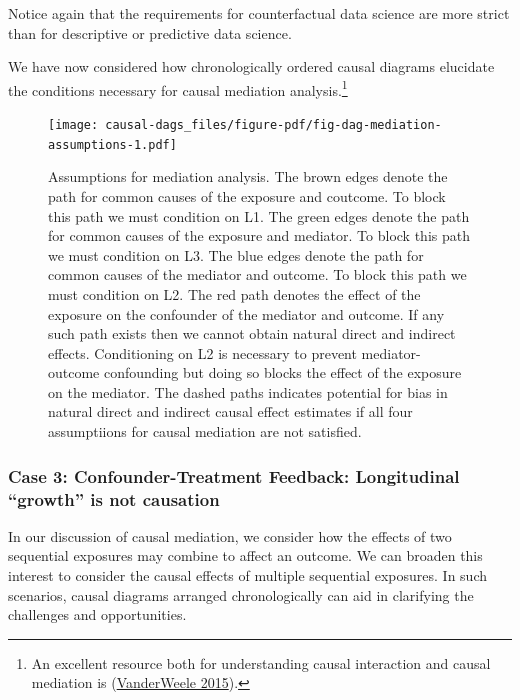 \documentclass[
  singlecolumn]{article}
\begin{document}
Notice again that the requirements for counterfactual data science are
more strict than for descriptive or predictive data science.

We have now considered how chronologically ordered causal diagrams
elucidate the conditions necessary for causal mediation
analysis.\footnote{An excellent resource both for understanding causal
  interaction and causal mediation is
  (\protect\hyperlink{ref-vanderweele2015}{VanderWeele 2015}).}

\begin{figure}

{\centering \texttt{[image: causal-dags\_files/figure-pdf/fig-dag-mediation-assumptions-1.pdf]}

}

\caption{\label{fig-dag-mediation-assumptions}Assumptions for mediation
analysis. The brown edges denote the path for common causes of the
exposure and coutcome. To block this path we must condition on L1. The
green edges denote the path for common causes of the exposure and
mediator. To block this path we must condition on L3. The blue edges
denote the path for common causes of the mediator and outcome. To block
this path we must condition on L2. The red path denotes the effect of
the exposure on the confounder of the mediator and outcome. If any such
path exists then we cannot obtain natural direct and indirect effects.
Conditioning on L2 is necessary to prevent mediator-outcome confounding
but doing so blocks the effect of the exposure on the mediator. The
dashed paths indicates potential for bias in natural direct and indirect
causal effect estimates if all four assumptiions for causal mediation
are not satisfied.}

\end{figure}

\hypertarget{case-3-confounder-treatment-feedback-longitudinal-growth-is-not-causation}{%
\subsubsection{Case 3: Confounder-Treatment Feedback: Longitudinal
``growth'' is not
causation}\label{case-3-confounder-treatment-feedback-longitudinal-growth-is-not-causation}}

In our discussion of causal mediation, we consider how the effects of
two sequential exposures may combine to affect an outcome. We can
broaden this interest to consider the causal effects of multiple
sequential exposures. In such scenarios, causal diagrams arranged
chronologically can aid in clarifying the challenges and opportunities.
\end{document}
